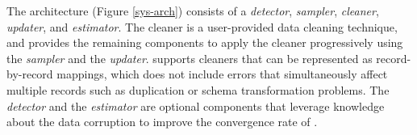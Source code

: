 








The \sys architecture (Figure \ref{sys-arch}) consists of a \emph{detector}, \emph{sampler}, \emph{cleaner}, \emph{updater}, and \emph{estimator}.
The cleaner is a user-provided data cleaning technique, and \sys provides the remaining components to apply the cleaner progressively using the \emph{sampler} and the \emph{updater}.
\sys supports cleaners that can be represented as record-by-record mappings, which does not include errors that simultaneously affect multiple records such as duplication or schema transformation problems.
The \emph{detector} and the \emph{estimator} are optional components that leverage knowledge about the data corruption to improve the convergence rate of \sys.

